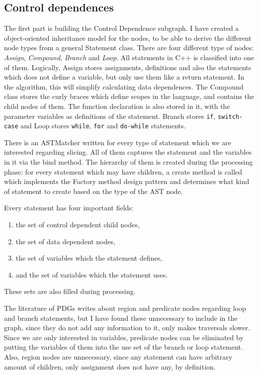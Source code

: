 \documentclass[oneside,12pt,a4paper]{book}
\begin{document}
\subsection{Control dependences}

The first part is building the Control Dependence subgraph. I have created a object-oriented inheritance model for the nodes, to be able to derive the different node types from a general Statement class. There are four different type of nodes: \textit{Assign}, \textit{Compound}, \textit{Branch} and \textit{Loop}. All statements in C++ is classified into one of them. Logically, Assign stores assignments, definitions and also the statements which does not define a variable, but only use them like a return statement. In the algorithm, this will simplify calculating data dependences. The Compound class stores the curly braces which define scopes in the language, and contains the child nodes of them. The function declaration is also stored in it, with the parameter variables as definitions of the statement. Branch stores \texttt{if}, \texttt{switch-case} and Loop stores \texttt{while}, \texttt{for} and \texttt{do-while} statements. 

There is an ASTMatcher written for every type of statement which we are interested regarding slicing. All of them captures the statement and the variables in it via the bind method. The hierarchy of them is created during the processing phase: for every statement which may have children, a create method is called which implements the Factory method design pattern and determines what kind of statement to create based on the type of the AST node. 

Every statement has four important fields:
\begin{enumerate}
\item the set of control dependent child nodes,
\item the set of data dependent nodes,
\item the set of variables which the statement defines,
\item and the set of variables which the statement uses.
\end{enumerate}

These sets are also filled during processing.

The literature of PDGs writes about region and predicate nodes regarding loop and branch statements, but I have found these unnecessary to include in the graph, since they do not add any information to it, only makes traversals slower. Since we are only interested in variables, predicate nodes can be eliminated by putting the variables of them into the use set of the branch or loop statement. Also, region nodes are unnecessary, since any statement can have arbitrary amount of children, only assignment does not have any, by definition.
\end{document}
